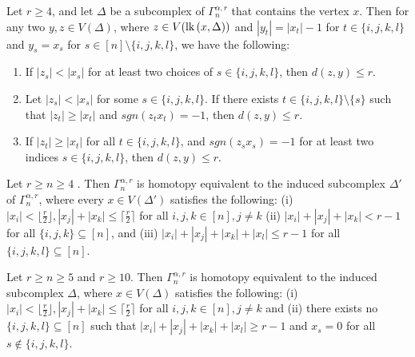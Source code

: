 \documentclass[10pt,a4paper]{amsart}
\newcommand{\D}{\Delta}
\newcommand{\cil}{\lceil\frac{r}{2}\rceil}
\newcommand{\f}{\lfloor\frac{r}{2}\rfloor}
\newcommand{\lk}{\mbox{\upshape lk}\,}
\begin{document}
\begin{lemma}\label{fourvertex}
	Let $r\geq 4$, and let  $\D$ be  a subcomplex of $\Gamma_n^{\alpha, r}$ that contains the vertex $x$. Then for any two $y, z \in V(\D)$, where $z\in V(\lk(x,\D))$ and  $|y_t|=|x_t|-1$ for $t\in\{i,j,k,l\}$ and $y_s=x_s$ for $s\in [n]\setminus\{i,j,k,l\}$, we have the following: 
	\begin{enumerate}[label=(\roman*)]
		\item If $|z_s|<|x_s|$ for at least two choices of $s\in\{i,j,k,l\}$,  then $d(z,y)\leq r$. 
		\item Let $|z_s|<|x_s|$ for some $s \in \{i, j, k, l\}$. If there exists $t \in \{i, j, k, l\} \setminus \{s\}$ such that $|z_t|\geq |x_t|$ and $sgn(z_tx_t)=-1$, then $d(z,y)\leq  r$. 
		\item If $|z_t|\geq |x_t|$ for all $t\in\{i,j,k,l\}$, and  $sgn(z_sx_s)=-1$  for at least two indices $s\in\{i,j,k,l\}$, then $d(z,y)\leq r$.
	\end{enumerate}
	
\end{lemma}

\begin{lemma}\label{sumoffour}
	Let $r\geq n\geq 4$ . Then $\Gamma_n^{\alpha, r}$ is homotopy equivalent to the induced subcomplex $\Delta'$ of $\Gamma_n^{\alpha, r}$, where every $x \in V(\Delta')$ satisfies the following: (i) $|x_i|< \f, |x_j|+|x_k|\leq \cil$ for all $i, j, k \in [n], j \neq k$ (ii) $|x_i| + |x_j| + |x_k| < r-1$ for all $\{i, j, k\}\subseteq [n]$, and (iii) $|x_i| + |x_j| + |x_k| + |x_l|\leq r-1$ for all  $\{i, j, k, l\} \subseteq [n]$.
\end{lemma}

\begin{lemma}\label{sumoffour2}
	Let $r \geq n \geq 5$ and  $r\geq 10$. Then $\Gamma_n^{\alpha, r}$ is homotopy equivalent to the induced subcomplex $\Delta$, where $x \in V(\Delta)$ satisfies the following:
	(i) $|x_i|< \f, |x_j|+|x_k|\leq \cil$ for all $i, j, k \in [n], j \neq k$ and (ii) there exists no $\{i, j, k , l\}\subseteq [n]$ such that $|x_i|+ |x_j|+ |x_k| + |x_l| \geq  r-1$ and $x_s=0$ for all $s\notin\{i,j,k,l\}$.
	
	
	
	
\end{lemma} 
\end{document}

